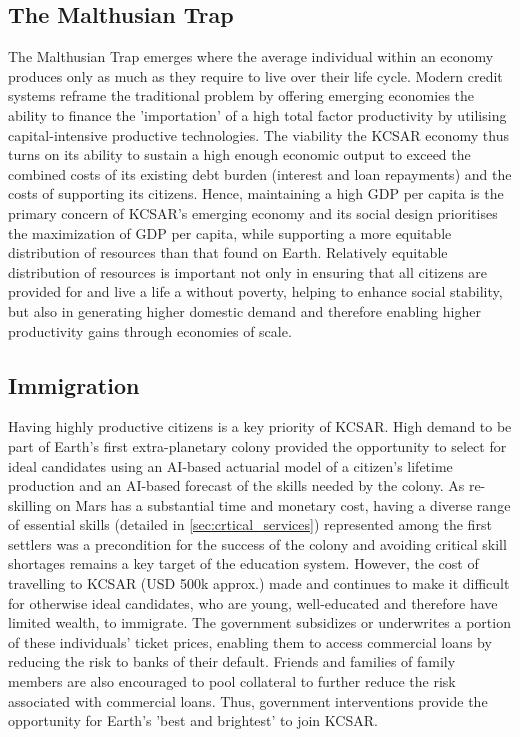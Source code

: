\documentclass[fleqn,10pt]{Stylesheet} %
\begin{document}
\subsection{The Malthusian Trap}
The Malthusian Trap emerges where the average individual within an economy produces only as much as they require to live over their life cycle. Modern credit systems reframe the traditional problem by offering emerging economies the ability to finance the 'importation' of a high total factor productivity by utilising capital-intensive productive technologies. The viability the KCSAR economy thus turns on its ability to sustain a high enough economic output to exceed the combined costs of its existing debt burden (interest and loan repayments) and the costs of supporting its citizens. Hence, maintaining a high GDP per capita is the primary concern of KCSAR's emerging economy and its social design prioritises the maximization of GDP per capita, while supporting a more equitable distribution of resources than that found on Earth. Relatively equitable distribution of resources is important not only in ensuring that all citizens are provided for and live a life a without poverty, helping to enhance social stability, but also in generating higher domestic demand and therefore enabling higher productivity gains through economies of scale. \cite{Kogel} 

\subsection{Immigration}
\label{sec:immigration}
Having highly productive citizens is a key priority of KCSAR. High demand to be part of Earth's first extra-planetary colony provided the opportunity to select for ideal candidates using an AI-based actuarial model of a citizen's lifetime production and an AI-based forecast of the skills needed by the colony. As re-skilling on Mars has a substantial time and monetary cost, having a diverse range of essential skills (detailed in \ref{sec:crtical_services}) represented among the first settlers was a precondition for the success of the colony and avoiding critical skill shortages remains a key target of the education system. However, the cost of travelling to KCSAR (USD 500k approx.) made and continues to make it difficult for otherwise ideal candidates, who are young, well-educated and therefore have limited wealth, to immigrate. The government subsidizes or underwrites a portion of these individuals' ticket prices, enabling them to access commercial loans by reducing the risk to banks of their default. Friends and families of family members are also encouraged to pool collateral to further reduce the risk associated with commercial loans. Thus, government interventions provide the opportunity for Earth's 'best and brightest' to join KCSAR.
\end{document}
